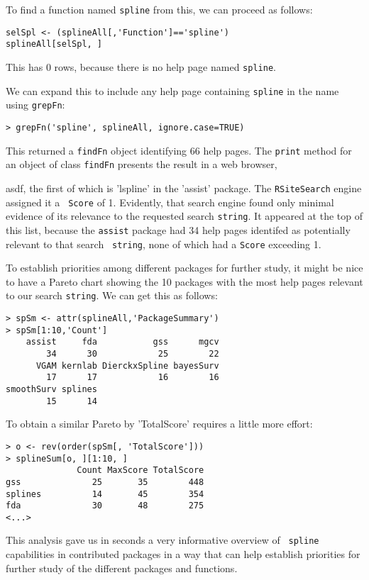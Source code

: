 To find a function named {\tt spline} from this, we can proceed as
follows:
\begin{verbatim}
selSpl <- (splineAll[,'Function']=='spline')
splineAll[selSpl, ]
\end{verbatim}
This has 0 rows, because there is no help page named {\tt spline}.




We can expand this to include any help page containing {\tt spline} in
the name using {\tt grepFn}:
\begin{verbatim}
> grepFn('spline', splineAll, ignore.case=TRUE)
\end{verbatim}
This returned a {\tt findFn} object identifying 66 help pages.
The {\tt print} method for an object of class {\tt findFn}
presents the result in a web browser,

asdf,
the first of which is 'lspline' in the
'assist' package.  The {\tt RSiteSearch} engine assigned it a {\tt
Score} of 1.  Evidently, that search engine found only minimal
evidence of its relevance to the requested search {\tt string}.  It
appeared at the top of this list, because the {\tt assist} package had
34 help pages identifed as potentially relevant to that search {\tt
string}, none of which had a {\tt Score} exceeding 1.

To establish priorities among different packages for further study, it
might be nice to have a Pareto chart showing the 10 packages with the
most help pages relevant to our search {\tt string}.  We can get this as
follows:
\begin{verbatim}
> spSm <- attr(splineAll,'PackageSummary')
> spSm[1:10,'Count']
    assist     fda           gss      mgcv
        34      30            25        22
      VGAM kernlab DierckxSpline bayesSurv
        17      17            16        16
smoothSurv splines
        15      14
\end{verbatim}
To obtain a similar Pareto by 'TotalScore' requires a little more
effort:
\begin{verbatim}
> o <- rev(order(spSm[, 'TotalScore']))
> splineSum[o, ][1:10, ]
              Count MaxScore TotalScore
gss              25       35        448
splines          14       45        354
fda              30       48        275
<...>
\end{verbatim}
This analysis gave us in seconds a very informative overview of {\tt
spline} capabilities in contributed \R{} packages in a way that can help
establish priorities for further study of the different packages and
functions.

